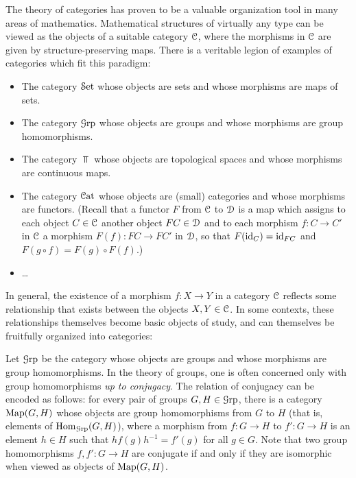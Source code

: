 \begin{1.1.1 Goals and Obstacles}
The theory of categories has proven to be a valuable organization tool in many areas of mathematics. Mathematical structures of virtually any type can be viewed as the objects of a suitable category $\operatorname{\mathcal{C}}$, where the morphisms in $\operatorname{\mathcal{C}}$ are given by structure-preserving maps. There is a veritable legion of examples of categories which fit this paradigm:
\begin{itemize}
\item The category $\operatorname{\mathcal{S}et}$ whose objects are sets and whose morphisms are maps of sets.
\item The category $\operatorname{\mathcal{G}rp}$ whose objects are groups and whose morphisms are group homomorphisms.
\item The category $\Top$ whose objects are topological spaces and whose morphisms are continuous maps.
\item The category $\operatorname{\mathcal{C}at}$ whose objects are (small) categories and whose morphisms
are functors. (Recall that a functor $F$ from $\operatorname{\mathcal{C}}$ to $\operatorname{\mathcal{D}}$ is a map which assigns to each object
$C \in \operatorname{\mathcal{C}}$ another object $FC \in \operatorname{\mathcal{D}}$ and to each morphism $f: C \rightarrow C'$ in
$\operatorname{\mathcal{C}}$ a morphism $F(f): FC \rightarrow FC'$ in $\operatorname{\mathcal{D}}$, so that $F( \operatorname{id}_C) = \operatorname{id}_{FC}$ and
$F(g \circ f) = F(g) \circ F(f)$.)
\item \ldots
\end{itemize}

In general, the existence of a morphism $f: X \rightarrow Y$ in a category $\operatorname{\mathcal{C}}$ reflects some relationship that exists between the objects $X,Y \in \operatorname{\mathcal{C}}$. In some contexts, these relationships themselves become basic objects of study, and can themselves be fruitfully organized into categories:

\begin{example}\label{2cat1}
Let $\operatorname{\mathcal{G}rp}$ be the category whose objects are groups and whose morphisms are group homomorphisms. In the theory of groups, one is often concerned only with group homomorphisms
{\em up to conjugacy}. The relation of conjugacy can be encoded as follows: for every pair of
groups $G, H \in \operatorname{\mathcal{G}rp}$, there is a category $\operatorname{{Map}}(G,H)$ whose objects are group homomorphisms
from $G$ to $H$ (that is, elements of $\operatorname{Hom}_{\operatorname{\mathcal{G}rp}}(G,H)$), where a morphism from $f: G \rightarrow H$ to $f': G \rightarrow H$ is an element $h \in H$ such that $h f(g) h^{-1} = f'(g)$ for all $g \in G$.
Note that two group homomorphisms $f,f': G \rightarrow H$ are conjugate if and only if they are isomorphic when viewed as objects of $\operatorname{{Map}}(G,H)$.
\end{example}


\end{1.1.1 Goals and Obstacles}
